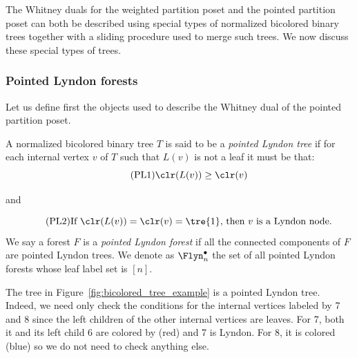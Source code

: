 The Whitney duals for the weighted partition poset and the pointed partition poset can both   be described using special types of normalized bicolored binary trees together with a sliding procedure used to merge   such trees.   We now discuss these special types of trees.


\subsubsection{Pointed Lyndon forests}

Let us define first the objects used to describe the Whitney dual of the pointed partition poset.

\begin{defi}
A normalized bicolored binary tree $T$ is said to be a \emph{pointed Lyndon tree} if for each internal vertex $v$ of $T$ such that $L(v)$ is not a leaf it must be that:
\begin{equation}\label{condition:pointed_lyndon_1}\tag{PL1}
\clr(L(v))\geq \clr(v)
\end{equation}
\begin{center} and \end{center}
\begin{equation}\label{condition:pointed_lyndon_2}\tag{PL2}
      \text{If } \clr(L(v))=\clr(v)=\tre{1}\text{, then $v$ is a Lyndon node.}
\end{equation}
 We say a forest $F$ is a \emph{pointed Lyndon forest} if  all the connected components of $F$ are pointed Lyndon trees.  We denote as   $\Flyn_{n}^{\bullet}$ the set of all pointed Lyndon forests whose leaf label set is $[n]$.   
\end{defi}

The tree in Figure~\ref{fig:bicolored_tree_example} is a pointed Lyndon tree. Indeed, we need only check the conditions for the internal vertices labeled by 7 and 8 since the left children of the other internal vertices are leaves.  For 7, both it and its left child 6 are colored by  (red) and 7 is Lyndon. For 8, it is colored  (blue) so we do not need to check anything else.  

